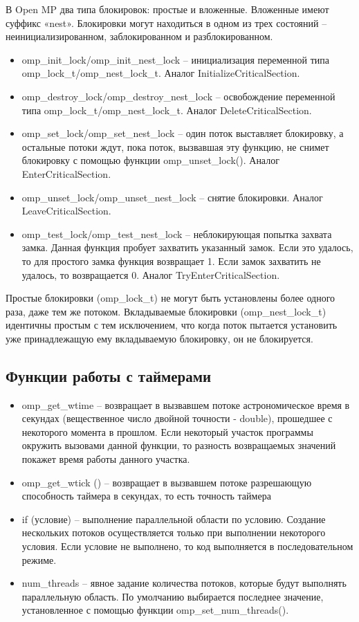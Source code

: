 \documentclass[a4paper, 14pt]{extreport}
\begin{document}
	В Open MP два типа блокировок: простые и вложенные. Вложенные имеют суффикс «nest». Блокировки могут находиться в одном из трех состояний – неинициализированном, заблокированном и разблокированном.
	\begin{itemize}
		\item omp\_init\_lock/omp\_init\_nest\_lock – инициализация переменной типа omp\_lock\_t/omp\_nest\_lock\_t. Аналог InitializeCriticalSection.
		\item	omp\_destroy\_lock/omp\_destroy\_nest\_lock – освобождение переменной типа omp\_lock\_t/omp\_nest\_lock\_t. Аналог DeleteCriticalSection.
		\item	omp\_set\_lock/omp\_set\_nest\_lock – один поток выставляет блокировку, а остальные потоки ждут, пока поток, вызвавшая эту функцию, не снимет блокировку с помощью функции omp\_unset\_lock(). Аналог EnterCriticalSection.
		\item	omp\_unset\_lock/omp\_unset\_nest\_lock – снятие блокировки. Аналог LeaveCriticalSection.
		\item	omp\_test\_lock/omp\_test\_nest\_lock – неблокирующая попытка захвата замка. Данная функция пробует захватить указанный замок. Если это удалось, то для простого замка функция возвращает 1. Если замок захватить не удалось, то возвращается 0. Аналог TryEnterCriticalSection.
	\end{itemize}
	
	Простые блокировки (omp\_lock\_t) не могут быть установлены более одного раза, даже тем же потоком. Вкладываемые блокировки (omp\_nest\_lock\_t) идентичны простым с тем исключением, что когда поток пытается установить уже принадлежащую ему вкладываемую блокировку, он не блокируется.
	
	\subsection{Функции работы с таймерами }
	\begin{itemize}
		\item omp\_get\_wtime – возвращает в вызвавшем потоке астрономическое время в секундах (вещественное число двойной точности - double), прошедшее с некоторого момента в прошлом. Если некоторый участок программы окружить вызовами данной функции, то разность возвращаемых значений покажет время работы данного участка.
		\item omp\_get\_wtick () – возвращает в вызвавшем потоке разрешающую  способность таймера в секундах, то есть точность таймера
		\item if (условие) – выполнение параллельной области по условию. Создание нескольких потоков осуществляется только при выполнении некоторого условия. Если условие не выполнено, то код выполняется в последовательном режиме.
		\item num\_threads – явное задание количества потоков, которые будут выполнять параллельную область. По умолчанию выбирается последнее значение, установленное с помощью функции omp\_set\_num\_threads().
	\end{itemize}
\end{document}
